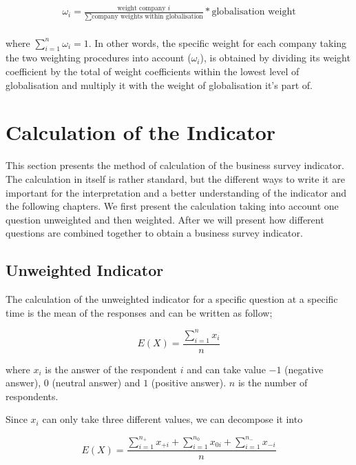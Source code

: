 \documentclass[12pt,a4paper,oneside]{book}
\begin{document}
\begin{eqnarray}
    \omega_i = \frac{ \text{weight company $i$} }{ \sum\text{company weights within globalisation} } * \text{globalisation weight} \\ \nonumber
\end{eqnarray}

where $\sum_{i=1}^{n} \omega_i = 1 $. In other words, the specific weight for each company taking the two weighting procedures into account ($\omega_i$), is obtained by dividing its weight coefficient by the total of weight coefficients within the lowest level of globalisation and multiply it with the weight of globalisation it's part of. 


\section{Calculation of the Indicator}

This section presents the method of calculation of the business survey indicator.
The calculation in itself is rather standard, but the different ways to write it are important for the interpretation and a better understanding of the indicator and the following chapters.
We first present the calculation taking into account one question unweighted and then weighted. 
After we will present how different questions are combined together to obtain a business survey indicator.


\subsection{Unweighted Indicator}

The calculation of the unweighted indicator for a specific question at a specific time is the mean of the responses and can be written as follow;

\begin{equation}
    E(X) = \frac{ \sum_{i=1}^n x_i}{n}
\end{equation} 

where 
$x_i$ is the answer of the respondent $i$ and can take value $-1$ (negative answer), $0$ (neutral answer) and $1$ (positive answer). 
$n$ is the number of respondents.

Since $x_i$ can only take three different values, we can decompose it into 

\begin{equation}
    E(X) = \frac{ \sum_{i=1}^{n_+} x_{+i} + \sum_{i=1}^{n_0} x_{0i} + \sum_{i=1}^{n_-} x_{-i}}{n}
\end{equation} 
\end{document}
